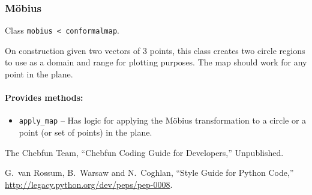 \documentclass[12pt]{article}
\begin{document}
\subsubsection{M\"obius}
Class \verb+mobius < conformalmap+.

On construction given two vectors of 3 points, this class creates two circle regions to use as a domain and range for plotting purposes. The map should work for any point in the plane.

\paragraph{Provides methods:}
\begin{itemize}
  \item \verb+apply_map+ -- Has logic for applying the M\"obius transformation to a circle or a point (or set of points) in the plane.
\end{itemize}


\begin{thebibliography}{99}
    The Chebfun Team,
    ``Chebfun Coding Guide for Developers,''
    Unpublished.

    G.\ van Rossum, B.\ Warsaw and N.\ Coghlan,
    ``Style Guide for Python Code,''
    \url{http://legacy.python.org/dev/peps/pep-0008}.

\end{thebibliography}
\end{document}

